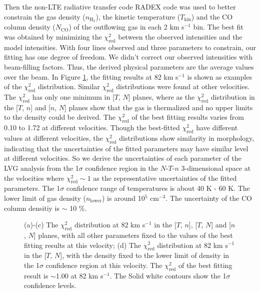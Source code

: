 Then the non-LTE radiative transfer code RADEX code \citep{2007A&A...468..627V} was used to better constrain the gas density ($n_{\mathrm{H}_2}$), the kinetic temperature ($T_{\mathrm{kin}}$) and the CO column density ($N_{\mathrm{CO}}$) of the outflowing gas in each 2 km s$^{-1}$ bin. The best fit was obtained by minimizing the $\chi^2_{\mathrm{red}}$ between the observed intensities and the model intensities. With four lines observed and three parameters to constrain, our fitting has one degree of freedom. We didn't correct our observed intensities with beam-filling factors. Thus, the derived physical parameters are the average values over the beam.  In Figure \ref{fig:fig4}, the fitting results at 82 km s$^{-1}$ is shown as examples of the $\chi^2_{\mathrm{red}}$ distribution. Similar $\chi^2_{\mathrm{red}}$ distributions were found at other velocities. The $\chi^2_{\mathrm{red}}$ has only one minimum in [$T$, $N$] planes, where as the $\chi^2_{\mathrm{red}}$ distribution in the [$T$, $n$] and [$n$, $N$] planes show that the gas is thermalized and no upper limits to the density could be derived. The $\chi^2_{\mathrm{red}}$ of the best fitting results varies from 0.10 to 1.72 at different velocities. Though the best-fitted $\chi^2_{\mathrm{red}}$ have different values at different velocities, the $\chi^2_{\mathrm{red}}$ distributions show similarity in morphology, indicating that the uncertainties of the fitted parameters may have similar level at different velocities. So we derive the uncertainties of each parameter of the LVG analysis from the 1$\sigma$ confidence region in the $N$-$T$-$n$ 3-dimensional space at the velocities where $\chi^2_{\mathrm{red}} \sim 1$ as the representative uncertainties of the fitted parameters. The 1$\sigma$ confidence range of temperatures is about 40 K - 60 K. The lower limit of gas density ($n_{\mathrm{lower}}$) is around 10$^5$ cm$^{-3}$. The uncertainty of the CO column densitiy is $\sim$ 10 \%. 

\begin{figure}
\caption{(a)-(c) The $\chi^2_{\mathrm{red}}$ distribution at 82 km s$^{-1}$ in the [$T$, $n$], [$T$, $N$] and [$n$, $N$] planes, with all other parameters fixed to the values of the best fitting results at this velocity; (d) The $\chi^2_{\mathrm{red}}$ distribution at 82 km s$^{-1}$ in the [$T$, $N$], with the density fixed to the lower limit of density in the 1$\sigma$ confidence region at this velocity. The $\chi^2_{\mathrm{red}}$ of the best fitting result is $\sim$1.00 at 82 km s$^{-1}$. The Solid white contours show the 1$\sigma$ confidence levels. \label{fig:fig4}}
\end{figure}

